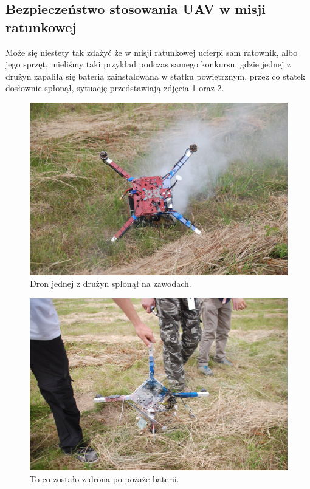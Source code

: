 \subsection{Bezpieczeństwo stosowania UAV w misji ratunkowej}
Może się niestety tak zdażyć że w misji ratunkowej ucierpi sam ratownik, albo jego sprzęt, mieliśmy taki przykład podczas samego konkursu, gdzie jednej z drużyn zapaliła się bateria zainstalowana w statku powietrznym, przez co statek dosłownie spłonął, sytuację przedstawiają zdjęcia \ref{fig:ploniedron1} oraz \ref{fig:ploniedron2}.

\begin{figure}[!th]
    \centering
    \includegraphics[width=15cm]{zalaczniki/obrazy/ploniedron1.jpg}
    \caption{Dron jednej z drużyn spłonął na zawodach.}
    \label{fig:ploniedron1}
\end{figure}

\begin{figure}[!th]
    \centering
    \includegraphics[width=15cm]{zalaczniki/obrazy/ploniedron2.jpg}
    \caption{To co zostało z drona po pożaże baterii.}
    \label{fig:ploniedron2}
\end{figure}

